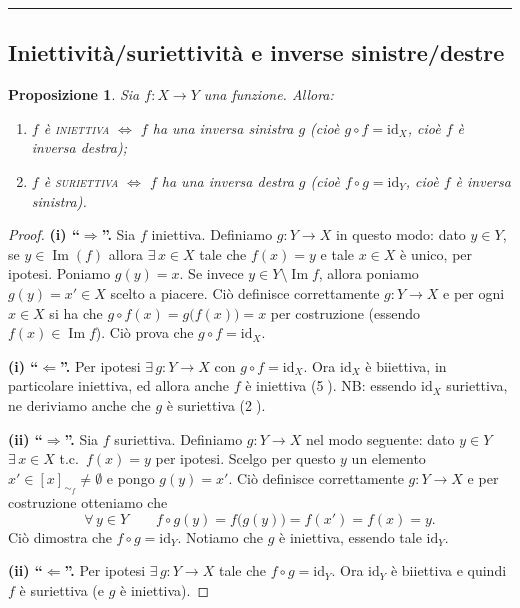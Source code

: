 \documentclass[11pt,a4paper]{article}
\newcommand{\id}{\mathrm{id}}
\newcommand{\im}{\operatorname{Im}}
\theoremstyle{definition}
\theoremstyle{plain}
\newtheorem{proposizione}[definizione]{Proposizione}
\theoremstyle{remark}
\begin{document}
\bigskip\hrule\bigskip

\subsection{Iniettivit\`a/suriettivit\`a e inverse sinistre/destre}

\begin{proposizione}\label{prop:inv}
Sia $f\colon X\to Y$ una funzione. Allora:
\begin{enumerate}[label=(\roman*)]
\item $f$ \`e \textsc{iniettiva} $\iff$ $f$ ha una inversa sinistra $g$ (cio\`e $g\circ f=\id_X$, cio\`e $f$ \`e inversa destra);
\item $f$ \`e \textsc{suriettiva} $\iff$ $f$ ha una inversa destra $g$ (cio\`e $f\circ g=\id_Y$, cio\`e $f$ \`e inversa sinistra).
\end{enumerate}
\end{proposizione}

\begin{proof}
\textbf{(i) ``$\Rightarrow$''.} Sia $f$ iniettiva. Definiamo $g\colon Y\to X$ in questo modo: dato $y\in Y$, se $y\in\im(f)$ allora $\exists\,x\in X$ tale che $f(x)=y$ e tale $x\in X$ \`e unico, per ipotesi. Poniamo $g(y)=x$. Se invece $y\in Y\setminus\im f$, allora poniamo $g(y)=x'\in X$ scelto a piacere. Ci\`o definisce correttamente $g\colon Y\to X$ e per ogni $x\in X$ si ha che $g\circ f(x)=g\bigl(f(x)\bigr)=x$ per costruzione (essendo $f(x)\in\im f$). Ci\`o prova che $g\circ f=\id_X$.

\textbf{(i) ``$\Leftarrow$''.} Per ipotesi $\exists\,g\colon Y\to X$ con $g\circ f=\id_X$. Ora $\id_X$ \`e biiettiva, in particolare iniettiva, ed allora anche $f$ \`e iniettiva (\textcircled{5}). \textsc{NB}: essendo $\id_X$ suriettiva, ne deriviamo anche che $g$ \`e suriettiva (\textcircled{2}).

\textbf{(ii) ``$\Rightarrow$''.} Sia $f$ suriettiva. Definiamo $g\colon Y\to X$ nel modo seguente: dato $y\in Y$ $\exists\,x\in X$ t.c.\ $f(x)=y$ per ipotesi. Scelgo per questo $y$ un elemento $x'\in[x]_{\sim_f}\neq\emptyset$ e pongo $g(y)=x'$. Ci\`o definisce correttamente $g\colon Y\to X$ e per costruzione otteniamo che
\[
\forall\,y\in Y\qquad f\circ g(y)=f\bigl(g(y)\bigr)=f(x')=f(x)=y .
\]
Ci\`o dimostra che $f\circ g=\id_Y$. Notiamo che $g$ \`e iniettiva, essendo tale $\id_Y$.

\textbf{(ii) ``$\Leftarrow$''.} Per ipotesi $\exists\,g\colon Y\to X$ tale che $f\circ g=\id_Y$. Ora $\id_Y$ \`e biiettiva e quindi $f$ \`e suriettiva (e $g$ \`e iniettiva). \qedhere
\end{proof}
\end{document}
